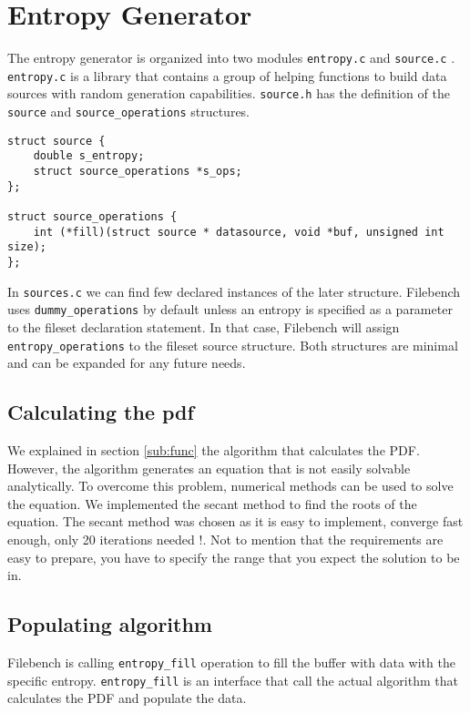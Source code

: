 \section{Entropy Generator}\label{sec:ent_imp}

The entropy generator is organized into two modules \verb+entropy.c+ and \verb+source.c+ . \verb+entropy.c+ is a library that contains a group of helping functions to build
 data sources with random generation capabilities. \verb+source.h+ has the definition of the \verb+source+ and \verb+source_operations+ structures.
\lstset{language=C}
\begin{lstlisting}
struct source {
    double s_entropy;
    struct source_operations *s_ops; 
};

struct source_operations {
    int (*fill)(struct source * datasource, void *buf, unsigned int size);
};

\end{lstlisting}


 In \verb+sources.c+ we can find few declared instances of the later structure. Filebench uses \verb+dummy_operations+ by default unless an entropy is specified as a parameter to the fileset declaration statement.
 In that case, Filebench will assign \verb+entropy_operations+ to the fileset source structure. Both structures are minimal and can be expanded for any future needs.

\subsection{Calculating the pdf}

We explained in section \ref{sub:func} the algorithm that calculates the PDF.
However, the algorithm generates an equation that is not easily solvable analytically.
 To overcome this problem, numerical methods can be used to solve the equation. We implemented the secant method to find the roots of the equation. The secant method was chosen as it is easy to implement, converge fast enough, only 20 iterations needed !.
 Not to mention that the requirements are easy to prepare, you have to specify the range that you expect the solution to be in.


\subsection{Populating algorithm}

Filebench is calling \verb+entropy_fill+ operation to fill the buffer with data with the specific entropy. \verb+entropy_fill+ is an interface that call the actual algorithm that calculates the PDF and populate the data.

